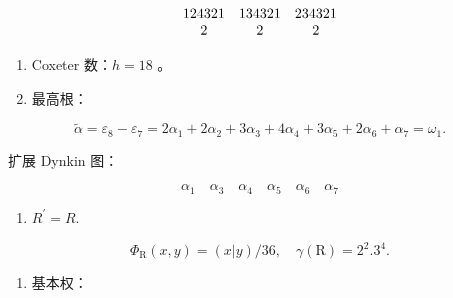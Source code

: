 \[
\begin{array}{c c c} 1 2 4 3 2 1 & 1 3 4 3 2 1 & 2 3 4 3 2 1 \\ 2 & 2 & 2 \end{array}
\]

\begin{enumerate}
\def\labelenumi{(\Roman{enumi})}
\setcounter{enumi}{2}
\item
  Coxeter 数：\(h = 18\) 。
\item
  最高根：
\end{enumerate}

\[
\tilde {\alpha} = \varepsilon_ {8} - \varepsilon_ {7} = 2 \alpha_ {1} + 2 \alpha_ {2} + 3 \alpha_ {3} + 4 \alpha_ {4} + 3 \alpha_ {5} + 2 \alpha_ {6} + \alpha_ {7} = \omega_ {1}.
\]

扩展 Dynkin 图：

\[
\alpha_ {1} \quad \alpha_ {3} \quad \alpha_ {4} \quad \alpha_ {5} \quad \alpha_ {6} \quad \alpha_ {7}
\]

\begin{enumerate}
\def\labelenumi{(\Alph{enumi})}
\setcounter{enumi}{21}
\tightlist
\item
  \(R^{\prime} = R.\)
\end{enumerate}

\[
  \Phi_ {\mathrm{R}} (x, y) = (x | y) / 36, \quad \gamma (\mathrm{R}) = 2 ^ {2}. 3 ^ {4}.
\]

\begin{enumerate}
\def\labelenumi{(\Roman{enumi})}
\setcounter{enumi}{5}
\tightlist
\item
  基本权：
\end{enumerate}

